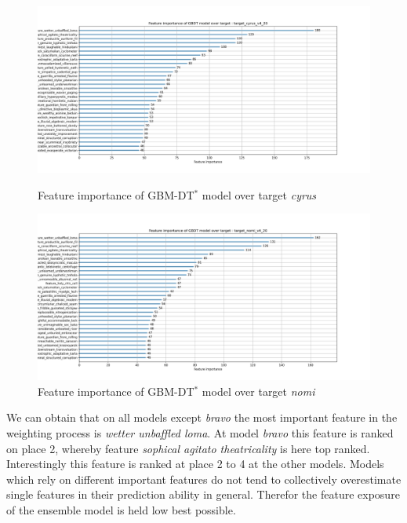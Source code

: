 \documentclass[12pt, a4paper]{article}
\begin{document}
\begin{figure}[htbp]
\begin{minipage}[t]{8cm}
\vspace{0pt}
\centering
\includegraphics[width=1\textwidth,trim={0 0 0 0},clip]{rounds/2024-01-17_round1_feature_importance_target_cyrus_v4_20.png}
\caption[Feature importance of GBDT model over target cyrus]{Feature importance of GBM-DT$^{\ast}$ model over target \textit{cyrus}}
\label{fig: fi_cyrus}
\end{minipage}
\hfill
\begin{minipage}[t]{8cm}
\vspace{0pt}
\centering
\includegraphics[width=1\textwidth,trim={0 0 0 0},clip]{rounds/2024-01-17_round1_feature_importance_target_nomi_v4_20.png}
\caption[Feature importance of model nomi]{Feature importance of GBM-DT$^{\ast}$ model over target \textit{nomi}}
\label{fig: fi_nomi}
\end{minipage}
\end{figure}
We can obtain that on all models except \textit{bravo} the most important feature in the weighting process is \textit{wetter unbaffled loma}.
At model \textit{bravo} this feature is ranked on place 2, whereby feature \textit{sophical agitato theatricality} is here top ranked. Interestingly this feature is ranked at place 2 to 4 at the other models. Models which rely on different important features do not tend to collectively overestimate single features in their prediction ability in general. Therefor the feature exposure of the ensemble model is held low best possible.
\end{document}
